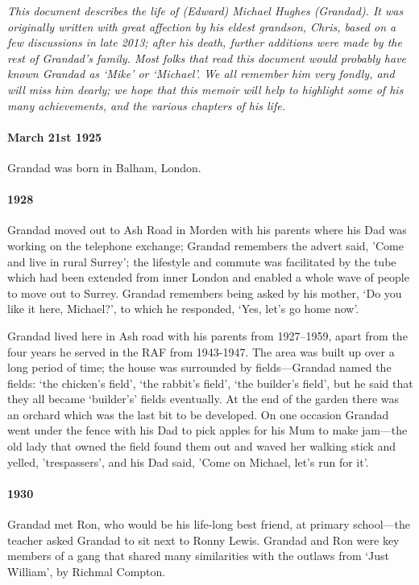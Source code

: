{\itshape This document describes the life of (Edward) Michael Hughes (Grandad). It was
	originally written with great affection by his eldest grandson, Chris, based on a few discussions in late 2013; after
	his death, further additions were made by the rest of Grandad's family. Most folks that read this
	document would probably have known Grandad as `Mike' or `Michael'. We all remember him very fondly, and will
	miss him dearly; we hope that this memoir will help to highlight some of his many achievements, and the
various chapters of his life.}

\paragraph{March 21st 1925} Grandad was born in Balham, London.
\paragraph{1928} Grandad moved out to Ash Road in Morden with his parents where his Dad was working on the telephone exchange;
Grandad remembers the advert said, 'Come and live in rural Surrey'; the lifestyle and commute was facilitated
by the tube which had been extended from inner London and enabled a whole
wave of people to move out to Surrey. Grandad remembers being asked by
his mother, `Do you like it here, Michael?', to which he responded, `Yes, let's go home now'.

Grandad lived here in Ash road with his parents from 1927--1959, apart from the four years he served
in the RAF from 1943-1947.  The area was built up over a long period of time;
the house was surrounded by fields---Grandad named the fields: `the chicken's field',
`the rabbit's field', `the builder's field', but he said that they all became `builder's'
fields eventually. At the end of the garden there
was an orchard which was the last bit to be developed. On one occasion Grandad went under the
fence with his Dad to pick apples for his Mum to make jam---the old lady that owned the field
found them out and waved her walking stick and yelled, 'trespassers', and his
Dad said, 'Come on Michael, let's run for it'.

\paragraph{1930} Grandad met Ron, who would be his life-long best friend, at primary
school---the teacher asked Grandad to sit next to Ronny Lewis. Grandad and Ron were key members
of a gang that shared many similarities with the outlaws from `Just William', by Richmal Compton.

